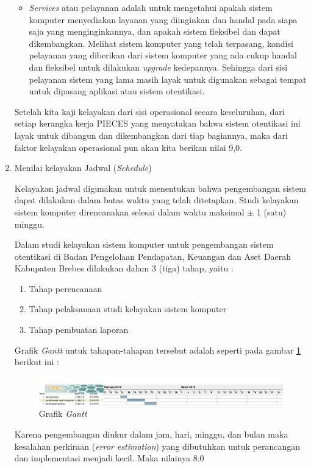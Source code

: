 \documentclass[pdftex,12pt, oneside]{article}
\begin{document}
\begin{enumerate}
\begin{itemize}
\item \textit{Services} atau pelayanan adalah untuk mengetahui apakah sistem komputer menyediakan layanan yang diinginkan dan handal pada siapa saja yang menginginkannya, dan apakah sistem fleksibel dan dapat dikembangkan. Melihat sistem komputer yang telah terpasang, kondisi pelayanan yang diberikan dari sistem komputer yang ada cukup handal dan fleksibel untuk dilakukan \textit{upgrade} kedepannya. Sehingga dari sisi pelayanan sistem yang lama masih layak untuk digunakan sebagai tempat untuk dipasang aplikasi atau sistem otentikasi.

\end{itemize}

Setelah kita kaji kelayakan dari sisi operasional secara keseluruhan, dari setiap kerangka kerja PIECES yang menyatakan bahwa sistem otentikasi ini layak untuk dibangun dan dikembangkan dari tiap bagiannya, maka dari faktor kelayakan operasional pun akan kita berikan nilai 9,0.

	\item Menilai kelayakan Jadwal (\textit{Schedule})
	
Kelayakan jadwal digunakan untuk menentukan bahwa pengembangan sistem dapat dilakukan dalam batas waktu yang telah ditetapkan. Studi kelayakan sistem komputer direncanakan selesai dalam waktu maksimal $\pm$ 1 (satu) minggu. 

Dalam studi kelayakan sistem komputer untuk pengembangan sistem otentikasi di Badan Pengelolaan Pendapatan, Keuangan dan Aset Daerah Kabupaten Brebes dilakukan dalam 3 (tiga) tahap, yaitu :

\begin{enumerate}
	\item Tahap perencanaan
	\item Tahap pelaksanaan studi kelayakan sistem komputer
	\item Tahap pembuatan laporan
\end{enumerate}

Grafik \textit{Gantt} untuk tahapan-tahapan tersebut adalah seperti pada gambar \ref{fig:002-gantt-chart} berikut ini :

\begin{figure}[H]
	\centering
	\includegraphics[width=1\textwidth]{./resources/gantt-chart}
	\caption{Grafik \textit{Gantt}}
	\label{fig:002-gantt-chart}
\end{figure}

Karena pengembangan diukur dalam jam, hari, minggu, dan bulan maka kesalahan perkiraan (\textit{error estimation}) yang dibutuhkan untuk perancangan dan implementasi menjadi kecil. Maka nilainya 8.0

\end{enumerate}
\end{document}

